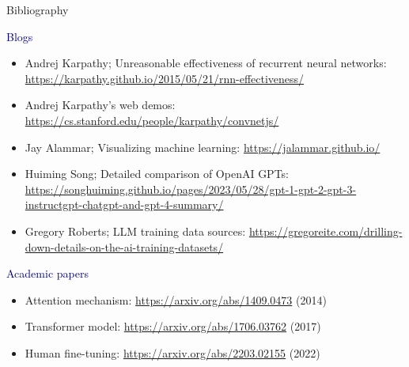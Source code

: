 \documentclass[aspectratio=169]{beamer}
\begin{document}
\begin{frame}{Bibliography}
\vspace{0.25 cm}
\small

\textcolor{darkblue}{Blogs}

\begin{itemize}
\item Andrej Karpathy; Unreasonable effectiveness of recurrent neural networks: \textcolor{blue}{\url{https://karpathy.github.io/2015/05/21/rnn-effectiveness/}}
\item Andrej Karpathy's web demos: \textcolor{blue}{\url{https://cs.stanford.edu/people/karpathy/convnetjs/}}
\item Jay Alammar; Visualizing machine learning: \textcolor{blue}{\url{https://jalammar.github.io/}}
\item Huiming Song; Detailed comparison of OpenAI GPTs: \textcolor{blue}{\url{https://songhuiming.github.io/pages/2023/05/28/gpt-1-gpt-2-gpt-3-instructgpt-chatgpt-and-gpt-4-summary/}}
\item Gregory Roberts; LLM training data sources: \textcolor{blue}{\url{https://gregoreite.com/drilling-down-details-on-the-ai-training-datasets/}}

\end{itemize}

\textcolor{darkblue}{Academic papers}

\begin{itemize}
\item Attention mechanism: \textcolor{blue}{\url{https://arxiv.org/abs/1409.0473}} (2014)
\item Transformer model: \textcolor{blue}{\url{https://arxiv.org/abs/1706.03762}} (2017)
\item Human fine-tuning: \textcolor{blue}{\url{https://arxiv.org/abs/2203.02155}} (2022)
\end{itemize}

\end{frame}
\end{document}
